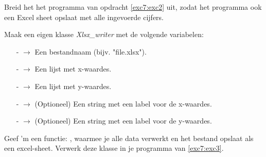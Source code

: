 \begin{exercise}
\label{exc7:exc3}
Breid het het programma van opdracht \ref{exc7:exc2} uit, zodat het programma ook een Excel sheet opslaat met alle ingevoerde cijfers.
\end{exercise}

\begin{exercise}
Maak een eigen klasse \textit{Xlsx\_writer} met de volgende variabelen: 
\begin{itemize}
  \item[-]{   $\rightarrow$ Een bestandnaam (bijv. "file.xlsx").}
  \item[-]{ $\rightarrow$ Een lijst met x-waardes.}
  \item[-]{ $\rightarrow$ Een lijst met y-waardes.}
  \item[-]{   $\rightarrow$ (Optioneel) Een string met een label voor de x-waardes.}
  \item[-]{   $\rightarrow$ (Optioneel) Een string met een label voor de y-waardes.}
\end{itemize}

Geef 'm een functie: , waarmee je alle data verwerkt en het bestand opslaat als een excel-sheet. Verwerk deze klasse in je programma van \ref{exc7:exc3}.
\end{exercise}


